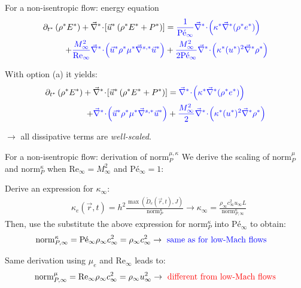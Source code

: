 \documentclass[xcolor=dvipsnames,10pt]{beamer}
\renewcommand{\Re}{\textrm{Re}}
\newcommand{\Pe}{\textrm{P\'e}}
\newcommand{\divv}[1]{\vec{\nabla}^{#1}\! \cdot \!}
\newcommand{\gradd}[1]{\vec{\nabla}^{#1}}
\newcommand{\norm}{\textrm{norm}}
\begin{document}
\begin{frame}{For a non-isentropic flow: energy equation}
\begin{align}
\partial_{t^*} \left( \rho^* E^* \right) 
+ \divv{*}  \left[ \vec{u}^* \left( \rho^* E^* + P^* \right) \right] 
&=
\textcolor{blue}{\frac{1}{\Pe_\infty} \divv{*}  \left( \kappa^*  \gradd{*} (\rho^* e^*) \right)} \nonumber  \\
+
\textcolor{blue}{\frac{M_\infty^2}{\Re_\infty} \divv{*}  \left( \vec{u}^* \rho^* \mu^* \gradd{s,*} \vec{u}^* \right)}
&+ 
\textcolor{blue}{\frac{M_\infty^2}{2 \Pe_\infty} \divv{*}  \left(\kappa^* (u^*)^2 \gradd{*} \rho^* \right)} \nonumber
\end{align}
\begin{block}{With option (a) it yields:}
\begin{align}
\partial_{t^*} \left( \rho^* E^* \right) 
+ \divv{*}  \left[ \vec{u}^* \left( \rho^* E^* + P^* \right) \right] 
&=
\textcolor{blue}{ \divv{*}  \left( \kappa^*  \gradd{*} (\rho^* e^*) \right)} \nonumber  \\
+
\textcolor{blue}{ \divv{*}  \left( \vec{u}^* \rho^* \mu^* \gradd{s,*} \vec{u}^* \right)}
&+ 
\textcolor{blue}{\frac{M_\infty^2}{2} \divv{*}  \left(\kappa^* (u^*)^2 \gradd{*} \rho^* \right)} \nonumber
\end{align}
\end{block}
$\to$ all dissipative terms are \emph{well-scaled}.
\end{frame}
\begin{frame}{For a non-isentropic flow: derivation of $\norm_P^{\mu, \kappa}$ }
We derive the scaling of $\norm_P^\mu$ and $\norm_P^\kappa$ when $\Re_\infty = M_\infty^2$ and $\Pe_\infty = 1$:
\begin{block}{}
Derive an expression for $\kappa_\infty$:
\begin{align}
&\kappa_e(\vec{r},t) = h^2 \frac{\max \left( \tilde{D}_e(\vec{r},t), J \right)}{\norm_P^\kappa} \longrightarrow \kappa_\infty = \frac{ \rho_\infty c_\infty^2 u_\infty L }{ \norm_{P,\infty}^\kappa } \nonumber 
\end{align}
Then, use the substitute the above expression for $\norm_P^\kappa$ into $\Pe_\infty$ to obtain:
\begin{align}
&\norm_{P,\infty}^{\kappa} = \Pe_\infty \rho_\infty c_\infty^2 = \rho_\infty c_\infty^2 \to \text{\color{blue}{ same as for low-Mach flows}}\nonumber
\end{align}
\end{block}
\begin{block}{}
Same derivation using $\mu_e$ and $\Re_\infty$ leads to:
\begin{align}
\norm_{P,\infty}^{\mu} = \Re_\infty \rho_\infty c_\infty^2 = \rho_\infty u_\infty^2 \to \text{\color{red}{ different from low-Mach flows}}\nonumber
\end{align}
\end{block}
\end{frame}
\end{document}
